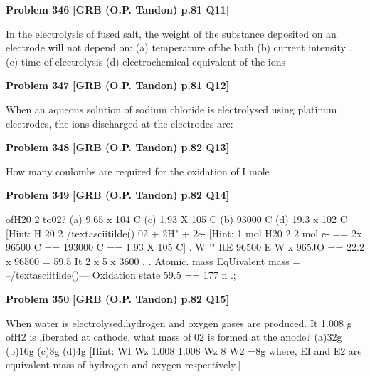 \begin{problembox}
\textbf{Problem 346} \hfill \textbf{[GRB (O.P. Tandon) p.81 Q11]}
\label{q:ext-grb_all_questions-346}

In the electrolysis of fused salt, the weight of the substance 
deposited on an electrode will not depend on: 
(a) temperature ofthe bath 
(b) current intensity 
. (c) time of electrolysis 
(d) electrochemical equivalent of the ions
\end{problembox}

\begin{problembox}
\textbf{Problem 347} \hfill \textbf{[GRB (O.P. Tandon) p.81 Q12]}
\label{q:ext-grb_all_questions-347}

When an aqueous solution of sodium chloride is electrolysed 
using platinum electrodes, the ions discharged at the 
electrodes are:
\end{problembox}

\begin{problembox}
\textbf{Problem 348} \hfill \textbf{[GRB (O.P. Tandon) p.82 Q13]}
\label{q:ext-grb_all_questions-348}

How many coulombs are required for the oxidation of I mole
\end{problembox}

\begin{problembox}
\textbf{Problem 349} \hfill \textbf{[GRB (O.P. Tandon) p.82 Q14]}
\label{q:ext-grb_all_questions-349}

ofH20 2 to02? 
(a) 9.65 x 104 C 
(c) 1.93 X 105 C 
(b) 93000 C 
(d) 19.3 x 102 C 
[Hint: 
H 20 2 /textasciitilde() 
02 + 2H" + 2e-
[Hint: 
1 mol H20 2 
2 mol e-
== 2x 96500 C 
== 193000 C 
== 1.93 X 105 C] 
. W '" ItE 
96500 
E 
W x 965JO == 22.2 x 96500 = 59.5 
It 
2 x 5 x 3600 
. 
. 
Atomic. mass 
EqUivalent mass = --/textasciitilde()--- 
Oxidation state 
59.5 == 177 
n 
.;
\end{problembox}

\begin{problembox}
\textbf{Problem 350} \hfill \textbf{[GRB (O.P. Tandon) p.82 Q15]}
\label{q:ext-grb_all_questions-350}

When water is electrolysed,hydrogen and oxygen gases are 
produced. It 1.008 g ofH2 is liberated at cathode, what mass 
of 02 is formed at the anode? 
(a)32g 
(b)16g 
(c)8g 
(d)4g 
[Hint: 
WI 
Wz 
1.008 
1.008 
Wz 
8 
W2 =8g 
where, EI and E2 are equivalent mass of hydrogen and oxygen 
respectively.]
\end{problembox}

